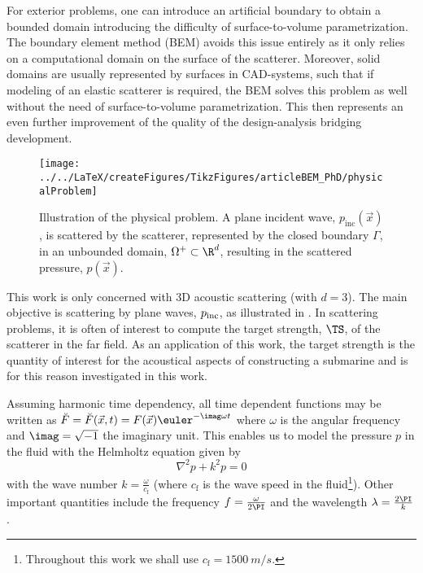 For exterior problems, one can introduce an artificial boundary to obtain a bounded domain introducing the difficulty of surface-to-volume parametrization. The boundary element method (BEM) avoids this issue entirely as it only relies on a computational domain on the surface of the scatterer. Moreover, solid domains are usually represented by surfaces in CAD-systems, such that if modeling of an elastic scatterer is required, the BEM solves this problem as well without the need of surface-to-volume parametrization. This then represents an even further improvement of the quality of the design-analysis bridging development.

\begin{figure}
	\centering
	\texttt{[image: ../../LaTeX/createFigures/TikzFigures/articleBEM\_PhD/physicalProblem]}
	\caption{Illustration of the physical problem. A plane incident wave, $p_{\mathrm{inc}}(\vec{x})$, is scattered by the scatterer, represented by the closed boundary $\Gamma$, in an unbounded domain, $\Omega^+\subset\R^d$, resulting in the scattered pressure, $p(\vec{x})$.}
	\label{Fig3:physicalProblem}
\end{figure}
This work is only concerned with 3D acoustic scattering (with $d=3$). The main objective is scattering by plane waves, $p_{\rm inc}$, as illustrated in . In scattering problems, it is often of interest to compute the target strength, $\TS$, of the scatterer in the far field. As an application of this work, the target strength is the quantity of interest for the acoustical aspects of constructing a submarine and is for this reason investigated in this work.

Assuming harmonic time dependency, all time dependent functions may be written as $\breve{F}=\breve{F}(\vec{x},t) = F(\vec{x})\euler^{-\imag\omega t}$ where $\omega$ is the angular frequency and $\imag = \sqrt{-1}$ the imaginary unit. This enables us to model the pressure $p$ in the fluid with the Helmholtz equation given by
\begin{equation}\label{Eq3:HelmholtzEquationIntro}
	\nabla^2 p + k^2 p = 0
\end{equation}
with the wave number $k=\frac{\omega}{c_{\mathrm{f}}}$ (where $c_{\mathrm{f}}$ is the wave speed in the fluid\footnote{Throughout this work we shall use $c_{\mathrm{f}}=\SI{1500}{m/s}$.}). Other important quantities include the frequency $f=\frac{\omega}{2\PI}$ and the wavelength $\lambda = \frac{2\PI}{k}$.

